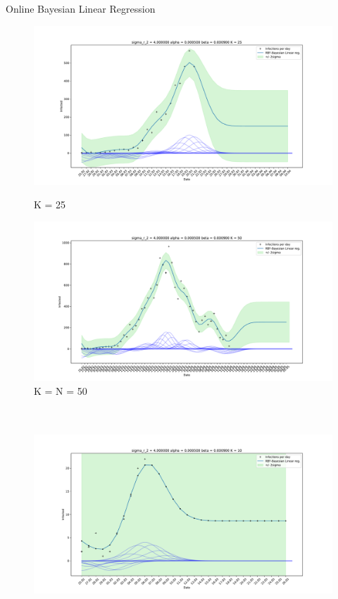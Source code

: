 \documentclass[english]{exercisesheet}
\begin{document}
\begin{nexercise}{Online Bayesian Linear Regression}
\begin{solution}
\begin{figure}
        \end{figure}
        \begin{figure}
        \centering
        \includegraphics[width=1\textwidth]{5.pdf}
        \caption{K = 25}
        \includegraphics[width=1\textwidth]{6.pdf}
        \caption{K = N = 50}
        \end{figure}
        \cleardoublepage
        \begin{figure}
        \includegraphics[width=1\textwidth, height=8cm]{7.pdf}

\end{figure}
\end{solution}
\end{nexercise}
\end{document}
